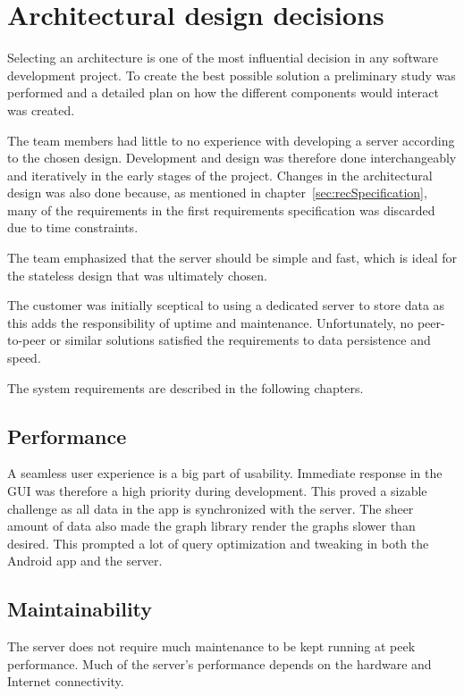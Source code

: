 \section{Architectural design decisions}
\label{sec:arch_design}
Selecting an architecture is one of the most influential decision in any software development project. To create the best possible solution a preliminary study was performed and a detailed plan on how the different components would interact was created. 

The team members had little to no experience with developing a server according to the chosen design. Development and design was therefore done interchangeably and iteratively in the early stages of the project. Changes in the architectural design was also done because, as mentioned in chapter~\ref{sec:recSpecification}, many of the requirements in the first requirements specification was discarded due to time constraints.

The team emphasized that the server should be simple and fast, which is ideal for the stateless design that was ultimately chosen. 

The customer was initially sceptical to using a dedicated server to store data as this adds the responsibility of uptime and maintenance. Unfortunately, no peer-to-peer or similar solutions satisfied the requirements to data persistence and speed.

The system requirements are described in the following chapters.

\subsection{Performance}
A seamless user experience is a big part of usability. Immediate response in the GUI was therefore a high priority during development. This proved a sizable challenge as all data in the app is synchronized with the server. 
The sheer amount of data also made the graph library render the graphs slower than desired. This prompted a lot of query optimization and tweaking in both the Android app and the server. 

\subsection{Maintainability}
The server does not require much maintenance to be kept running at peek performance. Much of the server's performance depends on the hardware and Internet connectivity. 

